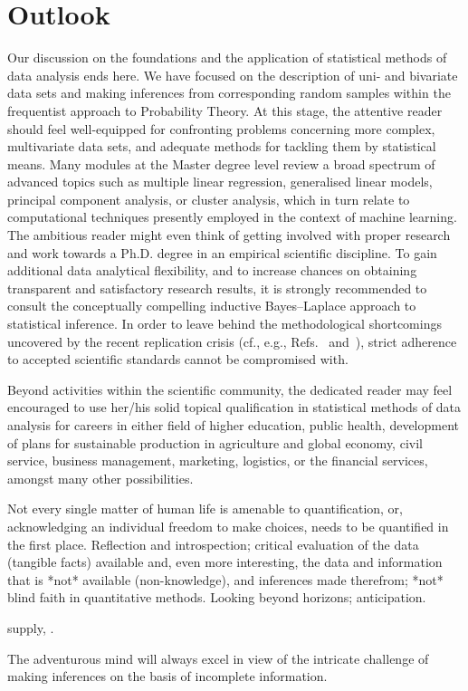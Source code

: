 \chapter*{Outlook}
Our discussion on the foundations and the application of
statistical methods of data analysis ends here. We have focused on
the description of uni- and bivariate data sets and making
inferences from corresponding random samples within the frequentist
approach to Probability Theory. At this stage, the attentive
reader should feel well-equipped for confronting problems
concerning more complex, multivariate data sets, and adequate
methods for tackling them by statistical means. Many modules at the
Master degree level review a broad spectrum of advanced topics such
as multiple linear regression, generalised linear models, principal
component analysis, or cluster analysis, which in turn relate to
computational techniques presently employed in the context of
machine learning. The ambitious reader might even think of getting
involved with proper research and work towards a Ph.D. degree in an
empirical scientific discipline. To gain additional data analytical
flexibility, and to increase chances on obtaining transparent
and satisfactory research results, it is strongly recommended to
consult the conceptually compelling inductive Bayes--Laplace
approach to statistical inference. In order to leave behind the
methodological shortcomings uncovered by the recent replication
crisis (cf., e.g., Refs.~ and~), strict
adherence to accepted scientific standards cannot be compromised
with. 

\medskip
\noindent
Beyond activities within the scientific community, the dedicated
reader may feel encouraged to use her/his solid topical
qualification in statistical methods of data analysis for careers
in either field of higher education, public health, development of
plans for sustainable production in agriculture and global economy,
civil service, business management, marketing, logistics, or the
financial services, amongst many other possibilities.

\medskip
\noindent
Not every single matter of human life is amenable to
quantification, or, acknowledging an individual freedom to make
choices, needs to be quantified in the first place.
Reflection and introspection; critical evaluation of the data
(tangible facts) available and, even more interesting,
the data and information that is *not* available (non-knowledge),
and inferences made therefrom; *not* blind faith in quantitative
methods. Looking beyond horizons; anticipation.

supply, .

The adventurous mind will always excel in view of the intricate
challenge of making inferences on the basis of incomplete
information.


